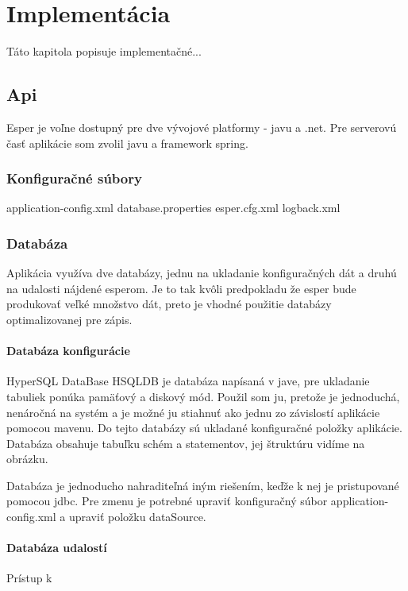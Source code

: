 \chapter{Implementácia}
Táto kapitola popisuje implementačné...

\section{Api}
	Esper je voľne dostupný pre dve vývojové platformy - javu a .net. Pre serverovú časť aplikácie som zvolil javu a framework spring.
	\subsection{Konfiguračné súbory}
		application-config.xml
		database.properties
		esper.cfg.xml
		logback.xml
	\subsection{Databáza}
		Aplikácia využíva dve databázy, jednu na ukladanie konfiguračných dát a druhú na udalosti nájdené esperom. Je to tak kvôli predpokladu že esper bude produkovať veľké množstvo dát, preto je vhodné použitie databázy optimalizovanej pre zápis.
	
		\subsubsection{Databáza konfigurácie}
		HyperSQL DataBase
		HSQLDB je databáza napísaná v jave, pre ukladanie tabuliek ponúka pamäťový a diskový mód. Použil som ju, pretože je jednoduchá, nenáročná na systém a je možné ju stiahnuť ako jednu zo závislostí aplikácie pomocou mavenu.
		Do tejto databázy sú ukladané konfiguračné položky aplikácie. Databáza obsahuje tabuľku schém a statementov, jej štruktúru vidíme na obrázku.
			
		Databáza je jednoducho nahraditeľná iným riešením, keďže k nej je pristupované pomocou jdbc. Pre zmenu je potrebné upraviť konfiguračný súbor application-config.xml a upraviť položku dataSource.
		
		\subsubsection{Databáza udalostí}
		Prístup k 
	
